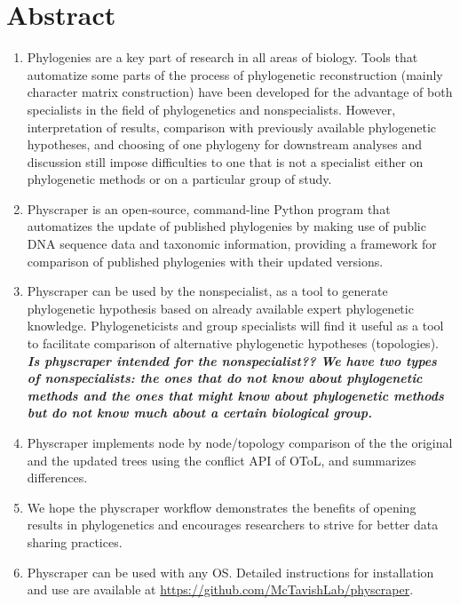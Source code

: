 \documentclass[]{article}
\author{}
\date{\vspace{-2.5em}}
\begin{document}
\newpage

\hypertarget{abstract}{%
\section{Abstract}\label{abstract}}

\begin{enumerate}
\def\labelenumi{\arabic{enumi}.}
\item
  Phylogenies are a key part of research in all areas of biology. Tools that automatize
  some parts of the process of phylogenetic reconstruction (mainly character matrix construction)
  have been developed for the advantage of both specialists in the field of phylogenetics and nonspecialists.
  However, interpretation of results, comparison with previously available phylogenetic
  hypotheses, and choosing of one phylogeny for downstream analyses and discussion still impose difficulties
  to one that is not a specialist either on phylogenetic methods or on a particular group of study.
\item
  Physcraper is an open‐source, command-line Python program that automatizes the update of published
  phylogenies by making use of public DNA sequence data and taxonomic information,
  providing a framework for comparison of published phylogenies with their updated versions.
\item
  Physcraper can be used by the nonspecialist, as a tool to generate phylogenetic
  hypothesis based on already available expert phylogenetic knowledge.
  Phylogeneticists and group specialists will find it useful as a tool to facilitate comparison
  of alternative phylogenetic hypotheses (topologies).
  \textbf{\emph{Is physcraper intended for the nonspecialist?? We have two types of nonspecialists:
  the ones that do not know about phylogenetic methods and the ones that might know
  about phylogenetic methods but do not know much about a certain biological group.}}
\item
  Physcraper implements node by node/topology comparison of the the original and the updated
  trees using the conflict API of OToL, and summarizes differences.
\item
  We hope the physcraper workflow demonstrates the benefits of opening results in phylogenetics and encourages researchers to strive for better data sharing practices.
\item
  Physcraper can be used with any OS. Detailed instructions for installation and
  use are available at \url{https://github.com/McTavishLab/physcraper}.
\end{enumerate}
\end{document}
